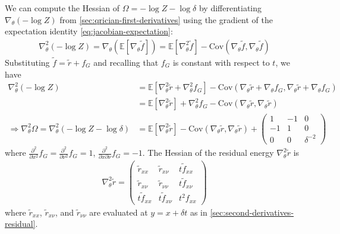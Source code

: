\documentclass{article}
\begin{document}
We can compute the Hessian of $\Omega = -\log Z - \log\delta$ by differentiating $\nabla_{\theta} (-\log Z)$ from \cref{sec:qrician-first-derivatives} using the gradient of the expectation identity \cref{eq:jacobian-expectation}:
%
\begin{align}
  \nabla_{\theta}^2 (-\log Z) = \nabla_\theta ( \mathbb{E}[\nabla_{\theta} \tilde{f}] ) = \mathbb{E}[\nabla_{\theta}^2 \tilde{f}] - \mathrm{Cov}(\nabla_{\theta} \tilde{f}, \nabla_{\theta} \tilde{f})
\end{align}
%
Substituting $\tilde{f} = \tilde{r} + f_G$ and recalling that $f_G$ is constant with respect to $t$, we have
%
\begin{align}
  \nabla_{\theta}^2 (-\log Z)                                                     & = \mathbb{E}[\nabla_{\theta}^2 \tilde{r} + \nabla_{\theta}^2 f_G] - \mathrm{Cov}(\nabla_{\theta} \tilde{r} + \nabla_{\theta} f_G, \nabla_{\theta} \tilde{r} + \nabla_{\theta} f_G)  \\
                                                                                  & = \mathbb{E}[\nabla_{\theta}^2 \tilde{r}] + \nabla_{\theta}^2 f_G - \mathrm{Cov}(\nabla_{\theta} \tilde{r}, \nabla_{\theta} \tilde{r}) \label{eq:residual-hessian-neglogz}          \\
  \Rightarrow \nabla_{\theta}^2 \Omega = \nabla_{\theta}^2 (-\log Z - \log\delta) & = \mathbb{E}[\nabla_{\theta}^2 \tilde{r}] - \mathrm{Cov}(\nabla_{\theta} \tilde{r}, \nabla_{\theta} \tilde{r}) + \begin{pmatrix} 1 & -1 & 0 \\ -1 & 1 & 0 \\ 0 & 0 & \delta^{-2} \end{pmatrix} \label{eq:residual-hessian-qrician}
\end{align}
%
where $\frac{\partial^2}{\partial x^2} f_G = \frac{\partial^2}{\partial \nu^2} f_G = 1$, $\frac{\partial^2}{\partial x \partial \nu} f_G = -1$.
The Hessian of the residual energy $\nabla_{\theta}^2 \tilde{r}$ is
%
\begin{align}
  \nabla_{\theta}^2 \tilde{r} = \begin{pmatrix} \tilde{r}_{xx} & \tilde{r}_{x\nu} & t \tilde{f}_{xx} \\ \tilde{r}_{x\nu} & \tilde{r}_{\nu\nu} & t \tilde{f}_{x\nu} \\ t \tilde{f}_{xx} & t \tilde{f}_{x\nu} & t^2 f_{xx} \end{pmatrix}
\end{align}
%
where $\tilde{r}_{xx}$, $\tilde{r}_{x\nu}$, and $\tilde{r}_{\nu\nu}$ are evaluated at $y=x + \delta t$ as in \cref{sec:second-derivatives-residual}.
\end{document}
